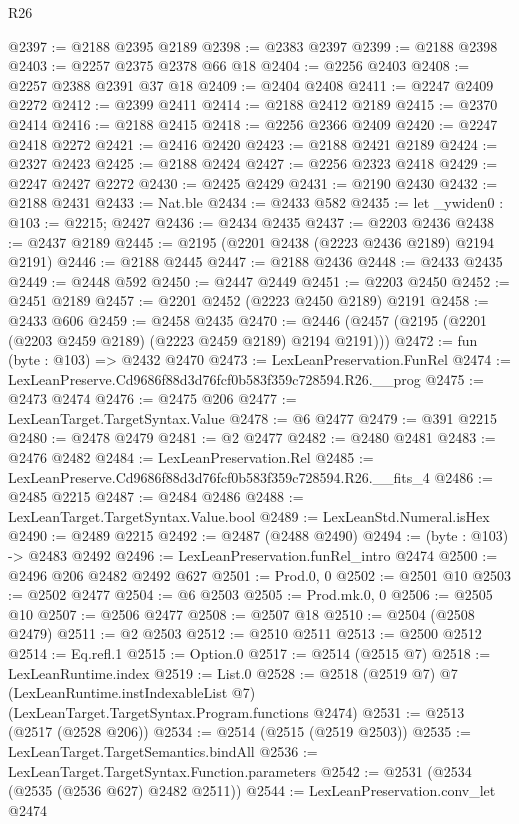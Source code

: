 \begin{lexlean}{R26}
\begin{coremodule}
@2397 := @2188 @2395 @2189
@2398 := @2383 @2397
@2399 := @2188 @2398
@2403 := @2257 @2375 @2378 @66 @18
@2404 := @2256 @2403
@2408 := @2257 @2388 @2391 @37 @18
@2409 := @2404 @2408
@2411 := @2247 @2409 @2272
@2412 := @2399 @2411
@2414 := @2188 @2412 @2189
@2415 := @2370 @2414
@2416 := @2188 @2415
@2418 := @2256 @2366 @2409
@2420 := @2247 @2418 @2272
@2421 := @2416 @2420
@2423 := @2188 @2421 @2189
@2424 := @2327 @2423
@2425 := @2188 @2424
@2427 := @2256 @2323 @2418
@2429 := @2247 @2427 @2272
@2430 := @2425 @2429
@2431 := @2190 @2430
@2432 := @2188 @2431
@2433 := Nat.ble
@2434 := @2433 @582
@2435 := let _ywiden0 : @103 := @2215; @2427
@2436 := @2434 @2435
@2437 := @2203 @2436
@2438 := @2437 @2189
@2445 := @2195 (@2201 @2438 (@2223 @2436 @2189) @2194 @2191)
@2446 := @2188 @2445
@2447 := @2188 @2436
@2448 := @2433 @2435
@2449 := @2448 @592
@2450 := @2447 @2449
@2451 := @2203 @2450
@2452 := @2451 @2189
@2457 := @2201 @2452 (@2223 @2450 @2189) @2191
@2458 := @2433 @606
@2459 := @2458 @2435
@2470 := @2446 (@2457 (@2195 (@2201 (@2203 @2459 @2189) (@2223 @2459 @2189) @2194 @2191)))
@2472 := fun (byte : @103) => @2432 @2470
@2473 := LexLeanPreservation.FunRel
@2474 := LexLeanPreserve.Cd9686f88d3d76fcf0b583f359c728594.R26.__prog
@2475 := @2473 @2474
@2476 := @2475 @206
@2477 := LexLeanTarget.TargetSyntax.Value
@2478 := @6 @2477
@2479 := @391 @2215
@2480 := @2478 @2479
@2481 := @2 @2477
@2482 := @2480 @2481
@2483 := @2476 @2482
@2484 := LexLeanPreservation.Rel
@2485 := LexLeanPreserve.Cd9686f88d3d76fcf0b583f359c728594.R26.__fits_4
@2486 := @2485 @2215
@2487 := @2484 @2486
@2488 := LexLeanTarget.TargetSyntax.Value.bool
@2489 := LexLeanStd.Numeral.isHex
@2490 := @2489 @2215
@2492 := @2487 (@2488 @2490)
@2494 := (byte : @103) -> @2483 @2492
@2496 := LexLeanPreservation.funRel_intro @2474
@2500 := @2496 @206 @2482 @2492 @627
@2501 := Prod.{0, 0}
@2502 := @2501 @10
@2503 := @2502 @2477
@2504 := @6 @2503
@2505 := Prod.mk.{0, 0}
@2506 := @2505 @10
@2507 := @2506 @2477
@2508 := @2507 @18
@2510 := @2504 (@2508 @2479)
@2511 := @2 @2503
@2512 := @2510 @2511
@2513 := @2500 @2512
@2514 := Eq.refl.{1}
@2515 := Option.{0}
@2517 := @2514 (@2515 @7)
@2518 := LexLeanRuntime.index
@2519 := List.{0}
@2528 := @2518
    (@2519 @7)
    @7
    (LexLeanRuntime.instIndexableList @7)
    (LexLeanTarget.TargetSyntax.Program.functions @2474)
@2531 := @2513 (@2517 (@2528 @206))
@2534 := @2514 (@2515 (@2519 @2503))
@2535 := LexLeanTarget.TargetSemantics.bindAll
@2536 := LexLeanTarget.TargetSyntax.Function.parameters
@2542 := @2531 (@2534 (@2535 (@2536 @627) @2482 @2511))
@2544 := LexLeanPreservation.conv_let @2474

\end{coremodule}
\end{lexlean}
